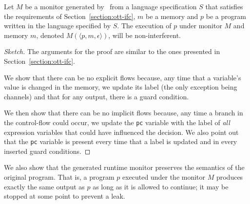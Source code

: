 \documentclass[conference]{IEEEtran}
\begin{document}
\begin{theorem}
	Let $M$ be a monitor generated by \ottifc\ from a language specification $S$ that satisfies the requirements of Section~\ref{section:ott-ifc}, $m$ be a memory and $p$ be a program written in the language specified by $S$. The execution of $p$ under monitor $M$ and memory $m$, denoted $M(\langle p, m, \epsilon \rangle)$, will be non-interferent.
\end{theorem}
\begin{proof}[Sketch]
	The arguments for the proof are similar to the ones presented in Section~\ref{section:ott-ifc}. 
	
	We show that there can be no explicit flows because, any time that a variable's value is changed in the memory, we update its label (the only exception being channels) and that for any output, there is a guard condition. 
	
	We then show that there can be no implicit flows because, any time a branch in the control-flow could occur, we update the \lstinline{pc} variable with the label of \emph{all} expression variables that could have influenced the decision. We also point out that the \lstinline{pc} variable is present every time that a label is updated and in every inserted guard conditions.
\end{proof}

We also show that the generated runtime monitor preserves the semantics of the original program. That is, a program $p$ executed under the monitor $M$ produces exactly the same output as $p$ as long as it is allowed to continue;  it may be stopped at some point to prevent a leak. 
\end{document}
